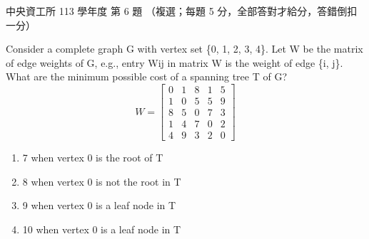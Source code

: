 \begin{pastexam}[label={px:ncu-113-dsa-06}]{中央資工所 113 學年度 第 6 題}
（複選；每題 5 分，全部答對才給分，答錯倒扣一分）

Consider a complete graph G with vertex set \{0, 1, 2, 3, 4\}. Let W be the matrix of edge weights of G,
e.g., entry Wij in matrix W is the weight of edge \{i, j\}. What are the minimum possible cost of a spanning
tree T of G?
\[
W=\begin{bmatrix}
0 & 1 & 8 & 1 & 5\\
1 & 0 & 5 & 5 & 9\\
8 & 5 & 0 & 7 & 3\\
1 & 4 & 7 & 0 & 2\\
4 & 9 & 3 & 2 & 0
\end{bmatrix}
\]
\begin{enumerate}[label=(\Alph*)]
\item 7 when vertex 0 is the root of T
\item 8 when vertex 0 is not the root in T
\item 9 when vertex 0 is a leaf node in T
\item 10 when vertex 0 is a leaf node in T
\end{enumerate}
\end{pastexam}

